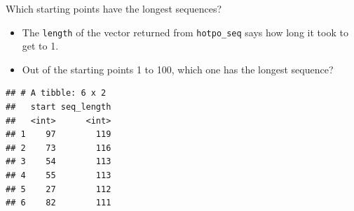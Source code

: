 \documentclass[ignorenonframetext,]{beamer}
\newenvironment{Shaded}{\begin{snugshade}}{\end{snugshade}}
\newcommand{\DataTypeTok}[1]{\textcolor[rgb]{0.13,0.29,0.53}{#1}}
\newcommand{\DecValTok}[1]{\textcolor[rgb]{0.00,0.00,0.81}{#1}}
\newcommand{\KeywordTok}[1]{\textcolor[rgb]{0.13,0.29,0.53}{\textbf{#1}}}
\newcommand{\NormalTok}[1]{#1}
\newcommand{\OperatorTok}[1]{\textcolor[rgb]{0.81,0.36,0.00}{\textbf{#1}}}
\newcommand{\StringTok}[1]{\textcolor[rgb]{0.31,0.60,0.02}{#1}}
\providecommand{\tightlist}{%
  \setlength{\itemsep}{0pt}\setlength{\parskip}{0pt}}
\begin{document}
\begin{frame}[fragile]{Which starting points have the longest
sequences?}
\protect\hypertarget{which-starting-points-have-the-longest-sequences}{}

\begin{itemize}
\tightlist
\item
  The \texttt{length} of the vector returned from \texttt{hotpo\_seq}
  says how long it took to get to 1.
\item
  Out of the starting points 1 to 100, which one has the longest
  sequence?
\end{itemize}

\begin{Shaded}
\end{Shaded}

\begin{verbatim}
## # A tibble: 6 x 2
##   start seq_length
##   <int>      <int>
## 1    97        119
## 2    73        116
## 3    54        113
## 4    55        113
## 5    27        112
## 6    82        111
\end{verbatim}

\end{frame}
\end{document}
